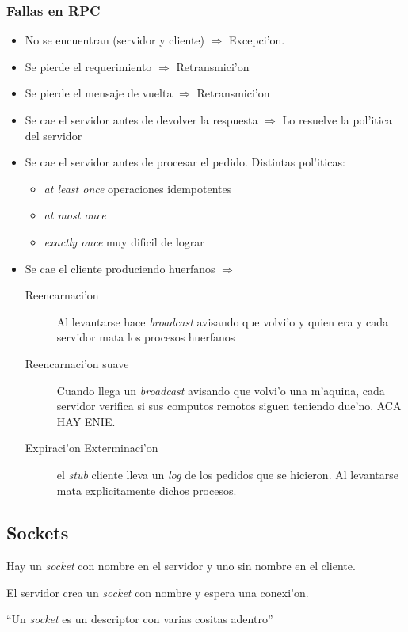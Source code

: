 \documentclass[a4paper,spanish]{article}
\begin{document}
\subsubsection{Fallas en RPC}
\begin{itemize}
	\item No se encuentran (servidor y cliente) $\Rightarrow$
Excepci'on.
	\item Se pierde el requerimiento $\Rightarrow$ Retransmici'on
	\item Se pierde el mensaje de vuelta $\Rightarrow$ Retransmici'on
	\item Se cae el servidor antes de devolver la respuesta
$\Rightarrow$ Lo resuelve la pol'itica del servidor
	\item Se cae el servidor antes de procesar el pedido. Distintas
pol'iticas:
		\begin{itemize}
			\item \emph{at least once} operaciones idempotentes
			\item \emph{at most once} 
			\item \emph{exactly once} muy dificil de lograr
		\end{itemize}
	\item Se cae el cliente produciendo huerfanos $\Rightarrow$
		\begin{description}
			\item[Reencarnaci'on] Al levantarse hace
\emph{broadcast} avisando que volvi'o y quien era y cada servidor mata los
procesos huerfanos
			\item[Reencarnaci'on suave] Cuando llega un
\emph{broadcast} avisando que volvi'o una m'aquina, cada servidor verifica si
sus computos remotos siguen teniendo due'no. ACA HAY ENIE.
			\item[Expiraci'on Exterminaci'on] el \emph{stub}
cliente lleva un \emph{log} de los pedidos que se hicieron. Al levantarse mata
explicitamente dichos procesos.
		\end{description}
\end{itemize}

\subsection{Sockets}
Hay un \emph{socket} con nombre en el servidor y uno sin nombre en el cliente.

El servidor crea un \emph{socket} con nombre y espera una conexi'on.

``Un \emph{socket} es un descriptor con varias cositas adentro''
\end{document}
